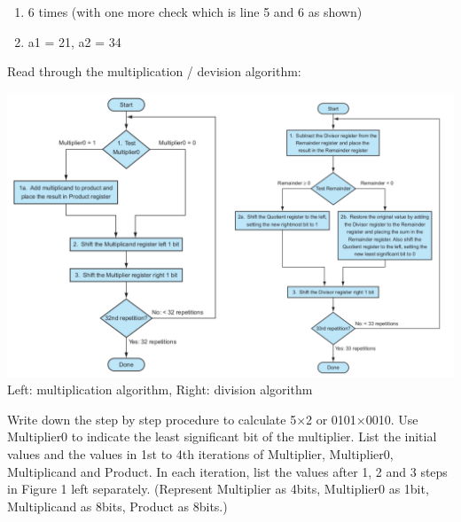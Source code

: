 \documentclass[12pt, a4paper]{article}
\begin{document}
\begin{ans}
    \begin{enumerate}
        \item 6 times (with one more check which is line 5 and 6 as shown)
        \item a1 = 21, a2 = 34 
    \end{enumerate}
\end{ans}
\pagebreak
\begin{q}{20}
Read through the multiplication / devision algorithm: 
\begin{center}
    \includegraphics[scale=0.36]{q2.png}
    Left: multiplication algorithm, Right: division algorithm
\end{center}
Write down the step by step procedure to calculate 5×2 or 0101×0010. Use Multiplier0
to indicate the least significant bit of the multiplier. List the initial values and the values
in 1st to 4th iterations of Multiplier, Multiplier0, Multiplicand and Product. In each
iteration, list the values after 1, 2 and 3 steps in Figure 1 left separately. (Represent
Multiplier as 4bits, Multiplier0 as 1bit, Multiplicand as 8bits, Product as 8bits.)
\end{q}
\end{document}

